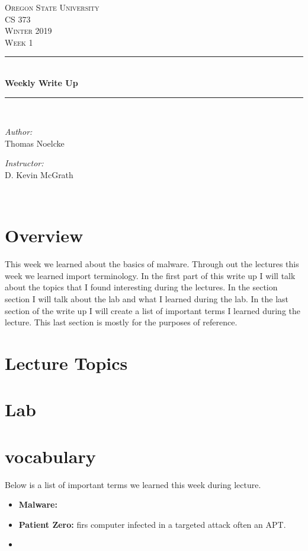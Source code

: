 \documentclass[letterpaper, onecolumn,10pt]{IEEEtran}
\begin{document}
    \begin{titlepage}
    \newcommand{\HRule}{\rule{\linewidth}{0.5mm}}
    \center
    \textsc{\Large Oregon State University}\\[1.5cm]
    \textsc{\Large CS 373}\\[0.5cm]
    \textsc{\Large Winter 2019}\\[0.5cm]
    \textsc{\Large Week 1}\\[0.5cm]
    \HRule \\[0.4cm]
    { \huge \bfseries Weekly Write Up}\\[0.4cm] %
    \HRule \\[1.5cm]
    \begin{minipage}{0.4\textwidth}
        \begin{flushleft} \large
        \emph{Author:}\\
        Thomas Noelcke
        \end{flushleft}
    \end{minipage}
    \begin{minipage}{0.4\textwidth}
        \begin{flushright} \large
        \emph{Instructor:} \\
        D. Kevin McGrath\\
        \end{flushright}
    \end{minipage}\\[2cm]
		\end{titlepage}
		
		
		\section{Overview}
		    This week we learned about the basics of malware. Through out the lectures this week we learned import terminology. In the first part of this write up I will talk about the topics that I found interesting during the lectures. In the section section I will talk about the lab and what I learned during the lab. In the last section of the write up I will create a list of important terms I learned during the lecture. This last section is mostly for the purposes of reference.\\
		
		\section{Lecture Topics}
		
		\section{Lab}
		
		\section{vocabulary}
		    Below is a list of important terms we learned this week during lecture.\\
		    \begin{itemize}
		        \item \textbf{Malware:}
		        \item \textbf{Patient Zero:} firs computer infected in a targeted attack often an APT.\\
		        \item
		    \end{itemize}
		
\end{document}
